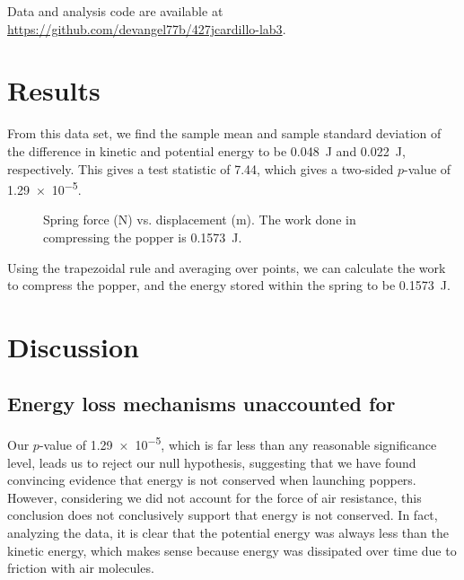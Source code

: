 \documentclass[reprint,amsmath,amssymb,aps,twoside]{revtex4-2} %
\begin{document}
Data and analysis code are available at \url{https://github.com/devangel77b/427jcardillo-lab3}.
    
    
    
    
\section{Results}
From this data set, we find the sample mean and sample standard deviation of the difference in kinetic and potential energy to be \qty{0.048}{\joule} and \qty{0.022}{\joule}, respectively. This gives a test statistic of 7.44, which gives a two-sided $p$-value of \num{1.29e-5}.




\begin{figure}
\begin{center}

\end{center}
\caption{Spring force (\unit{\newton}) vs. displacement (\unit{\meter}). The work done in compressing the popper is \qty{0.1573}{\joule}.}
\label{fig:2}
\end{figure}
Using the trapezoidal rule and averaging over points, we can calculate the work to compress the popper, and the energy stored within the spring to be \qty{0.1573}{\joule}.





    
    
\section{Discussion}
\subsection{Energy loss mechanisms unaccounted for}
Our $p$-value of \num{1.29e-5}, which is far less than any reasonable significance level, leads us to reject our null hypothesis, suggesting that we have found convincing evidence that energy is not conserved when launching poppers. However, considering we did not account for the force of air resistance, this conclusion does not conclusively support that energy is not conserved. In fact, analyzing the data, it is clear that the potential energy was always less than the kinetic energy, which makes sense because energy was dissipated over time due to friction with air molecules. 
\end{document}
